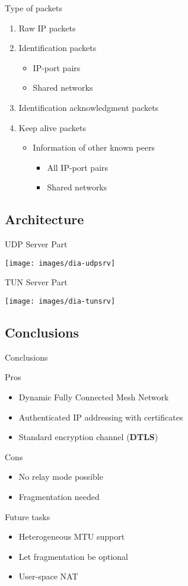 \documentclass{beamer}
\newcommand*{\comparativeframe}[5]{
\begin{frame}{#1}
	#2
	\begin{exampleblock}{Pros}
		\begin{itemize}
		#3
		\end{itemize}
	\end{exampleblock}
	\begin{alertblock}{Cons}
		\begin{itemize}
		#4
		\end{itemize}
	\end{alertblock}
	#5
\end{frame}
}
\begin{document}
\begin{frame}{Type of packets}
	\begin{enumerate}
	\item Raw IP packets
	\vspace{1em}
	\item Identification packets
		\begin{itemize}
		\item IP-port pairs
		\item Shared networks
		\end{itemize}
	\item Identification acknowledgment packets
	\item Keep alive packets
		\begin{itemize}
		\item Information of other known peers
			\begin{itemize}
			\item All IP-port pairs
			\item Shared networks
			\end{itemize}
		\end{itemize}
	\end{enumerate}
\end{frame}
\subsection{Architecture}
\begin{frame}{UDP Server Part}
	\begin{center}
	\texttt{[image: images/dia-udpsrv]}
	\end{center}
\end{frame}
\begin{frame}{TUN Server Part}
	\begin{center}
	\texttt{[image: images/dia-tunsrv]}
	\end{center}
\end{frame}
\subsection{Conclusions}
\comparativeframe{Conclusions}{}
{%
\item Dynamic Fully Connected Mesh Network
\item Authenticated IP addressing with certificates
\item Standard encryption channel (\textbf{DTLS})
}{%
\item No relay mode possible
\item Fragmentation needed
}{
\begin{block}{Future tasks}\begin{itemize}
\item Heterogeneous MTU support
\item Let fragmentation be optional
\item User-space NAT
\end{itemize}\end{block}
}
\end{document}
